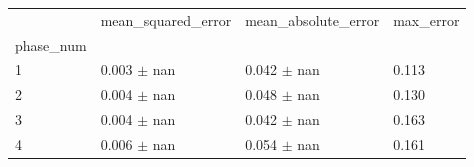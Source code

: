 \begin{tabular}{llll}
\toprule
 & mean_squared_error & mean_absolute_error & max_error \\
phase_num &  &  &  \\
\midrule
1 & 0.003 $\pm$ nan & 0.042 $\pm$ nan & 0.113 \\
2 & 0.004 $\pm$ nan & 0.048 $\pm$ nan & 0.130 \\
3 & 0.004 $\pm$ nan & 0.042 $\pm$ nan & 0.163 \\
4 & 0.006 $\pm$ nan & 0.054 $\pm$ nan & 0.161 \\
\bottomrule
\end{tabular}
